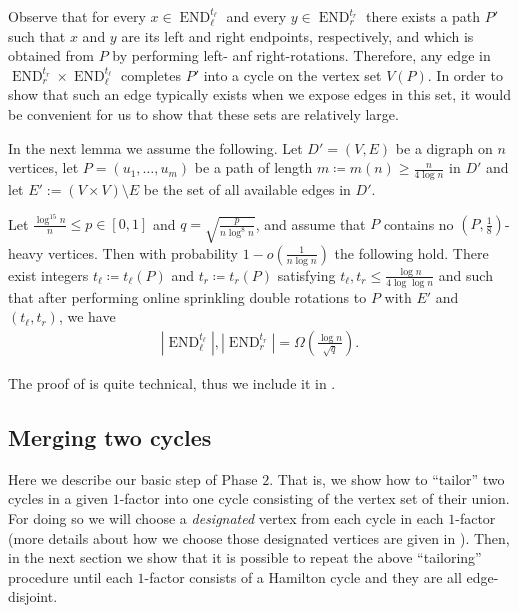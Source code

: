 \documentclass{article}
\DeclareMathOperator{\END}{END}
\begin{document}
	Observe that for every $x\in \END_{\ell}^{t_{\ell}}$ and every $y\in \END_r^{t_r} $ there exists a path $P'$ such that $x$ and $y$ are its left and right endpoints, respectively, and which is obtained from $P$ by performing left- anf right-rotations.
	Therefore, any edge in $\END_r^{t_r}\times \END_{\ell}^{t_{\ell}}$ completes $P'$ into a cycle on the vertex set $V(P)$.
	In order to show that such an edge typically exists when we expose edges in this set, it would be convenient for us to show that these sets are relatively large.  
	
	In the next lemma we assume the following.
	Let $D'=(V,E)$ be a digraph on $n$ vertices, let $P = (u_1, \ldots, u_m)$ be a path of length $m \coloneqq m(n) \ge \frac{n}{4\log n}$ in $D'$ and let $E':=(V\times V)\setminus E$ be the set of all available edges in $D'$.
	
	\begin{lemma}
		\label{lem:ManyRotationPaths}
		Let $\frac{\log^{15}n}{n} \le p \in [0,1]$ and $q = \sqrt{\frac{p}{n \log^8 n}}$, and assume that $P$ contains no $\left(P, \frac{1}{8} \right)$-heavy vertices.
		Then with probability $1-o\left(\frac{1}{n \log n} \right)$ the following hold.
		There exist integers $t_{\ell} \coloneqq t_{\ell}(P)$ and $t_r \coloneqq t_r(P)$ satisfying $t_{\ell}, t_r \le \frac{\log n}{4\log\log n}$ and such that after performing online sprinkling double rotations to $P$ with $E'$ and $(t_{\ell},t_r)$, we have
		\begin{align}
		\label{eq:ENDq}
		\left|\END_{\ell}^{t_{\ell}} \right|, \left|\END_r^{t_r} \right| = \Omega\left(\tfrac{\log n}{\sqrt{q}} \right).
		\end{align}
	\end{lemma}
	
	The proof of  is quite technical, thus we include it in .
	
	
	\subsection{Merging two cycles}
	
	Here we describe our basic step of Phase $2$.
	That is, we show how to ``tailor'' two cycles in a given $1$-factor into one cycle consisting of the vertex set of their union.
	For doing so we will choose a \emph{designated} vertex from each cycle in each $1$-factor (more details about how we choose those designated vertices are given in ).
	Then, in the next section we show that it is possible to repeat the above ``tailoring'' procedure until each $1$-factor consists of a Hamilton cycle and they are all edge-disjoint.
	
\end{document}
